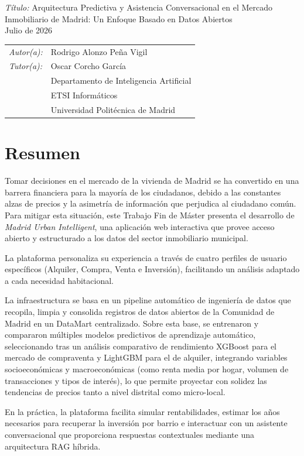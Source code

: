 \documentclass[a4paper,11pt,openany]{book}
\newcommand{\NombreAutor}{Rodrigo Alonzo Peña Vigil}
\newcommand{\TituloTFM}{Arquitectura Predictiva y Asistencia Conversacional en el Mercado Inmobiliario de Madrid: Un Enfoque Basado en Datos Abiertos}
\newcommand{\NombreTutor}{Oscar Corcho García}
\newcommand{\Departamento}{Departamento de Inteligencia Artificial}
\newcommand{\Fecha}{Julio de 2026}
\begin{document}
\textit{Título:} \TituloTFM \\
\Fecha

\vspace*{7cm}

\noindent
\begin{tabular}{ll}
\textit{Autor(a):} & \NombreAutor  \\ 
\textit{Tutor(a):} & \NombreTutor  \\ 
                & \Departamento \\
                & ETSI Informáticos\\
                & Universidad Politécnica de Madrid
\end{tabular} 

\frontmatter

\chapter*{Resumen}
Tomar decisiones en el mercado de la vivienda de Madrid se ha convertido en una barrera financiera para la mayoría de los ciudadanos, debido a las constantes alzas de precios y la asimetría de información que perjudica al ciudadano común. Para mitigar esta situación, este Trabajo Fin de Máster presenta el desarrollo de \textit{Madrid Urban Intelligent}, una aplicación web interactiva que provee acceso abierto y estructurado a los datos del sector inmobiliario municipal.

La plataforma personaliza su experiencia a través de cuatro perfiles de usuario específicos (Alquiler, Compra, Venta e Inversión), facilitando un análisis adaptado a cada necesidad habitacional.

La infraestructura se basa en un pipeline automático de ingeniería de datos que recopila, limpia y consolida registros de datos abiertos de la Comunidad de Madrid en un DataMart centralizado. Sobre esta base, se entrenaron y compararon múltiples modelos predictivos de aprendizaje automático, seleccionando tras un análisis comparativo de rendimiento XGBoost para el mercado de compraventa y LightGBM para el de alquiler, integrando variables socioeconómicas y macroeconómicas (como renta media por hogar, volumen de transacciones y tipos de interés), lo que permite proyectar con solidez las tendencias de precios tanto a nivel distrital como micro-local.

En la práctica, la plataforma facilita simular rentabilidades, estimar los años necesarios para recuperar la inversión por barrio e interactuar con un asistente conversacional que proporciona respuestas contextuales mediante una arquitectura RAG híbrida.
\end{document}
